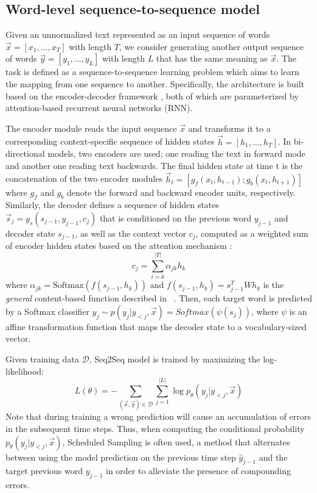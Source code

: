 \documentclass[letterpaper]{article} \usepackage{aaai19}  \usepackage{times}  \usepackage{helvet} \usepackage{courier}  \usepackage[hyphens]{url}  \usepackage{graphicx} \urlstyle{rm} \def\UrlFont{\rm}  \usepackage{graphicx}  \frenchspacing  \setlength{\pdfpagewidth}{8.5in}  \setlength{\pdfpageheight}{11in}
\newcommand{\citet}[1]{\citeauthor{#1}~\shortcite{#1}}
\newcommand{\citep}{\cite}
\begin{document}
\subsection{Word-level sequence-to-sequence model}
Given an unnormalized text represented as an input sequence of words $\vec{x} = [x_1, \dots, x_T]$ with length $T$, we consider generating another output sequence of words $\vec{y} = [y_1, \dots, y_L]$ with length $L$ that has the same meaning as $\vec{x}$.  
The task is defined as a sequence-to-sequence learning problem which aims to learn the mapping from one sequence to another. Specifically, the architecture is built based on the encoder-decoder framework \citep{cho2014learning,sutskever2014sequence}, both of which are parameterized by attention-based recurrent neural networks (RNN). 

The encoder module reads the input sequence $\vec{x}$ and transforms it to a corresponding context-specific sequence of hidden states $\vec{h} = [h_1, \dots, h_T]$. In bi-directional models, two encoders are used; one reading the text in forward mode and another one reading text backwards. The final hidden state at time t  is the concatenation of the two encoder modules $\vec{h}_t = [g_{f}(x_t,h_{t-1}); g_{b}(x_t,h_{t+1})]$ where $g_{f}$ and $g_{b}$ denote the forward and backward encoder units, respectively. Similarly, the decoder defines a sequence of hidden states $\vec{s}_j = g_s(s_{j-1}, y_{j-1},  c_j)$ that is conditioned on the previous word $y_{j-1}$ and decoder state $s_{j-1}$, as well as the context vector $c_j$, computed as a weighted sum of encoder hidden states based on the attention mechanism \citep{bahdanau2014neural}:
$$c_j = \sum_{i=k}^{|T|} \alpha_{jk}h_{k}$$
where $\alpha_{jk} = \text{Softmax}(f(s_{j-1}, h_k))$ and $f(s_{j-1}, h_k) = s^{T}_{j-1}Wh_k$ is the \textit{general} content-based function described in \citet{luong2015effective}. Then, each target word is predicted by a Softmax classifier  $y_j \sim  p(y_j|y_{<j},\vec{x}) = Softmax(\psi(s_j))$, where $\psi$ is an affine transformation function that maps the decoder state to a vocabulary-sized vector.

Given training data $\mathcal{D}$, Seq2Seq model is trained by maximizing the log-likelihood:
$$ L(\theta) = - \sum_{(\vec{x},\vec{y}) \in \mathcal{D}} \sum_{j=1}^{|L|} \log p_{\theta}(y_j|y_{<j},\vec{x})$$
Note that during training a wrong prediction will cause an accumulation of errors in the subsequent time steps. Thus, when computing the conditional probability $p_{\theta}(y_j|y_{<j},\vec{x})$, Scheduled Sampling \citep{bengio2015scheduled} is often used, a method that alternates between using the model prediction on the previous time step $\hat{y}_{j-1}$ and the target previous word $y_{j-1}$ in order to alleviate the presence of compounding errors.
\end{document}
